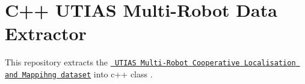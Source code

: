 \chapter{C++ UTIAS Multi-\/\+Robot Data Extractor}
\hypertarget{index}{}\label{index}
\label{index_md__2home_2dan_2Code_2UTIAS-Multi-Robot_2Data-Extractor_2README}%
%
This repository extracts the \href{http://asrl.utias.utoronto.ca/datasets/mrclam/index.html}{\texttt{ UTIAS Multi-\/\+Robot Cooperative Localisation and Mappihng dataset}} into c++ class . 